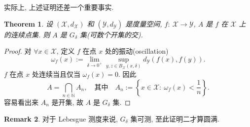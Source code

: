 \documentclass[a4paper,11pt]{article}
\newtheorem{theorem}{Theorem}[section]
\theoremstyle{definition}
\newtheorem{remark}[theorem]{Remark}
\begin{document}
\begin{CJK*}{UTF8}{gbsn}
实际上, 上述证明还差一个重要事实.

\begin{theorem} \label{1}
    设 $ (\mathcal{X}, d_\mathcal{X}) $ 和 $ (\mathcal{Y}, d_\mathcal{Y}) $ 是度量空间,
    $ f :\ \mathcal{X} \to \mathcal{Y} $, $ A $ 是 $ f $ 在 $ \mathcal{X} $ 上的连续点集.
    则 $ A $ 是 $ G_\delta $ 集(可数个开集的交).
\end{theorem}

\begin{proof}
    对 $ \forall x \in \mathcal{X} $, 定义 $ f $ 在点 $ x $ 处的振动(oscillation)
    $$
        \omega_f(x) := \lim_{\delta \to 0^+} \sup_{y, z \in B_\mathcal{X}(x, \delta)} 
            d_\mathcal{Y} \left( f(x), f(y) \right) .
    $$
    $ f $ 在点 $ x $ 处连续当且仅当 $ \omega_f(x) = 0 $. 因此
    $$
        A = \bigcap_{n \in \mathbb{N}} A_n, 
        \quad\text{其中}\quad A_n := \left\{ x \in \mathcal{X} :\ \omega_f(x) < \frac{1}{n} \right\}.
    $$
    容易看出来 $ A_n $ 是开集, 故 $ A $ 是 $ G_\delta $ 集.
\end{proof}

\begin{remark}
    对于 Lebesgue 测度来说, $ G_\delta $ 集可测, 至此证明二才算圆满.
\end{remark}

\end{CJK*}
\end{document}
